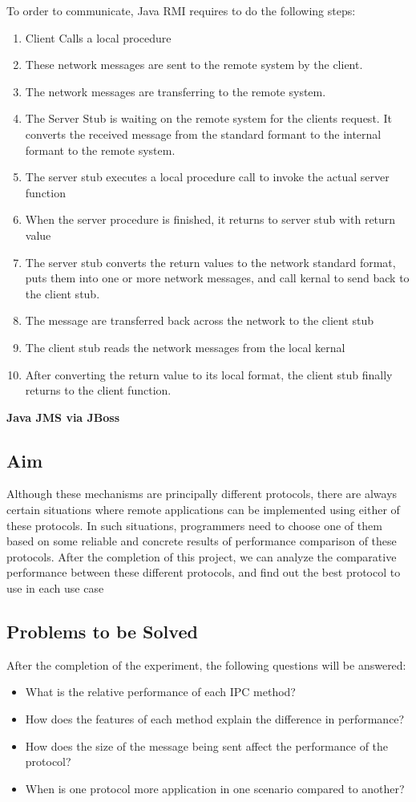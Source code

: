 \documentclass{article}
\begin{document}
To order to communicate, Java RMI requires to do the following steps:
\begin{enumerate}
\item Client Calls a local procedure
\item These network messages are sent to the remote system by the client.
\item The network messages are transferring to the remote system.
\item The Server Stub is waiting on the remote system for the clients request. It converts the received message from the standard formant to the internal formant to the remote system.
\item The server stub executes a local procedure call to invoke the actual server function
\item When the server procedure is finished, it returns to server stub with return value
\item The server stub converts the return values to the network standard format, puts them into one or more network messages, and call kernal to send back to the client stub.
\item The message are transferred back across the network to the client stub
\item The client stub reads the network messages from the local kernal
\item After converting the return value to its local format, the client stub finally returns to the client function.
\end{enumerate}

\textbf{Java JMS via JBoss}


\subsection{Aim}
Although these mechanisms are principally different protocols, there are always certain situations where remote applications can be implemented using either of these protocols. In such situations, programmers need to choose one of them based on some reliable and concrete results of performance comparison of these protocols. After the completion of this project, we can analyze the comparative performance between these different protocols, and find out the best protocol to use in each use case  \\


\subsection{Problems to be Solved}
After the completion of the experiment, the following questions will be answered:
\begin{itemize}
\item What is the relative performance of each IPC method?
\item How does the features of each method explain the difference in performance?	
\item How does the size of the message being sent affect the performance of the protocol?
\item When is one protocol more application in one scenario compared to another?
\end{itemize}
\end{document}
